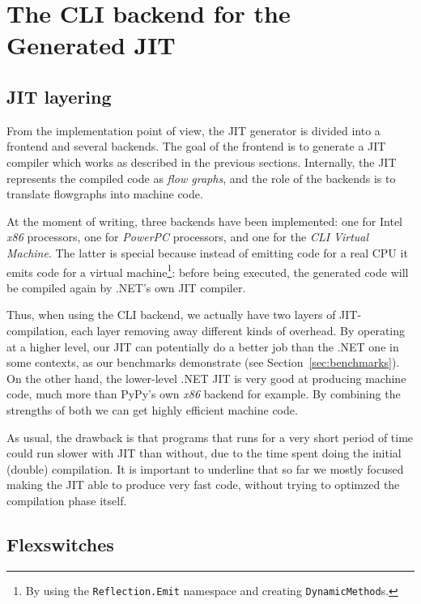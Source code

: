 \section{The CLI backend for the Generated JIT}
\label{sec:clibackend}

\subsection{JIT layering}

From the implementation point of view, the JIT generator is divided into a
frontend and several backends.  The goal of the frontend is to generate a JIT
compiler which works as described in the previous sections.  Internally, the
JIT represents the compiled code as \emph{flow graphs}, and the role of
the backends is to translate flowgraphs into machine code.

At the moment of writing, three backends have been implemented: one for Intel
\emph{x86} processors, one for \emph{PowerPC} processors, and one for the
\emph{CLI Virtual Machine}.  The latter is special because instead of emitting
code for a real CPU it emits code for a virtual machine\footnote{By using the 
\lstinline{Reflection.Emit} namespace and creating \lstinline{DynamicMethod}s.}: 
before being
executed, the generated code will be compiled again by .NET's own JIT
compiler.

Thus, when using the CLI backend, we actually have two layers of
JIT-compilation, each layer removing away different kinds of overhead.  By
operating at a higher level, our JIT can potentially do a better job than the
.NET one in some contexts, as our benchmarks demonstrate (see
Section~\ref{sec:benchmarks}).  On the other hand, the lower-level .NET JIT is
very good at producing machine code, much more than PyPy's own \emph{x86}
backend for example.  By combining the strengths of both we can get highly
efficient machine code.

As usual, the drawback is that programs that runs for a very short period of
time could run slower with JIT than without, due to the time spent doing the
initial (double) compilation.  It is important to underline that so far we
mostly focused making the JIT able to produce very fast code, without trying
to optimzed the compilation phase itself.

\subsection{Flexswitches}

